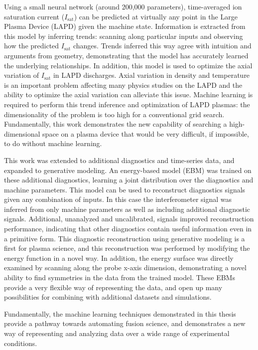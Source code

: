 Using a small neural network (around 200,000 parameters), time-averaged ion saturation current ($I_\text{sat}$) can be predicted at virtually any point in the Large Plasma Device (LAPD) given the machine state. Information is extracted from this model by inferring trends: scanning along particular inputs and observing how the predicted $I_\text{sat}$ changes. Trends inferred this way agree with intuition and arguments from geometry, demonstrating that the model has accurately learned the underlying relationships. In addition, this model is used to optimize the axial variation of $I_\text{sat}$ in LAPD discharges. Axial variation in density and temperature is an important problem affecting many physics studies on the LAPD and the ability to optimize the axial variation can alleviate this issue. Machine learning is required to perform this trend inference and optimization of LAPD plasmas: the dimensionality of the problem is too high for a conventional grid search. Fundamentally, this work demonstrates the new capability of searching a high-dimensional space on a plasma device that would be very difficult, if impossible, to do without machine learning.

This work was extended to additional diagnostics and time-series data, and expanded to generative modeling. An energy-based model (EBM) was trained on these additional diagnostics, learning a joint distribution over the diagnostics and machine parameters. This model can be used to reconstruct diagnostics signals given any combination of inputs. In this case the interferometer signal was inferred from only machine parameters as well as including additional diagnostic signals. Additional, unanalyzed and uncalibrated, signals improved reconstruction performance, indicating that other diagnostics contain useful information even in a primitive form. This diagnostic reconstruction using generative modeling is a first for plasma science, and this reconstruction was performed by modifying the energy function in a novel way. In addition, the energy surface was directly examined by scanning along the probe x-axis dimension, demonstrating a novel ability to find symmetries in the data from the trained model. These EBMs provide a very flexible way of representing the data, and open up many possibilities for combining with additional datasets and simulations.

Fundamentally, the machine learning techniques demonstrated in this thesis provide a pathway towards automating fusion science, and demonstrates a new way of representing and analyzing data over a wide range of experimental conditions. 


